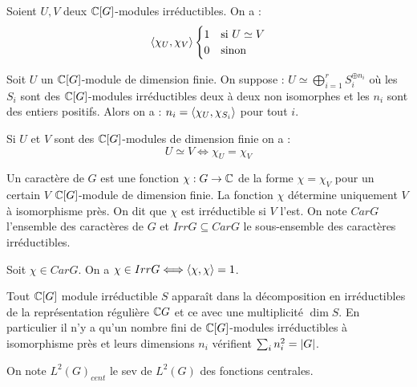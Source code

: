 \documentclass{cours}
\begin{document}
\begin{theorem}
    Soient $U, V$ deux $\mathbb{C}[G]$-modules irréductibles. On a :
    \[
        \left\langle \chi_{U}, \chi_{V} \right\rangle \begin{cases}
            1 & \text{si } U \simeq V \\
            0 & \text{sinon}
        \end{cases}
    \]
\end{theorem}
\begin{corollary}
    Soit $U$ un $\mathbb{C}[G]$-module de dimension finie. On suppose : $U \simeq \bigoplus_{i = 1}^{r} S_{i}^{\oplus n_{i}}$
    où les $S_{i}$ sont des $\mathbb{C}[G]$-modules irréductibles deux à deux non isomorphes et les $n_{i}$ sont des entiers positifs.
    Alors on a : $n_{i} = \left\langle \chi_{U}, \chi_{S_{i}} \right\rangle$ pour tout $i$.
\end{corollary}
\begin{corollary}
    Si $U$ et $V$ sont des $\mathbb{C}[G]$-modules de dimension finie on a :
    \[
        U \simeq V \Longleftrightarrow \chi_{U} = \chi_{V}
    \]
\end{corollary}

\begin{definition}
    Un caractère de $G$ est une fonction $\chi : G \rightarrow \mathbb{C}$ de la forme $\chi = \chi_V$ pour un certain $V$ $\mathbb{C}[G]$-module de dimension finie. La fonction $\chi$ détermine uniquement $V$ à isomorphisme près. On dit que $\chi$ est irréductible si $V$ l'est. On note $Car G$ l'ensemble des caractères de $G$ et $Irr G \subseteq Car G$ le sous-ensemble des caractères irréductibles.
\end{definition}

\begin{corollary}
    Soit $\chi \in Car G$. On a $\chi \in Irr G \Longleftrightarrow \left\langle \chi, \chi \right\rangle = 1$.
\end{corollary}

\begin{corollary}
    Tout $\mathbb{C}[G]$ module irréductible $S$ apparaît dans la décomposition en irréductibles de la représentation régulière $\mathbb{C} G$ et ce avec une multiplicité $\dim S$. En particulier il n'y a qu'un nombre fini de $\mathbb{C}[G]$-modules irréductibles à isomorphisme près et leurs dimensions $n_{i}$ vérifient $\sum_{i}n_{i}^{2} = \left|G\right|$.
\end{corollary}

\begin{definition}
    On note $L^{2}(G)_{cent}$ le sev de $L^{2}(G)$ des fonctions centrales.
\end{definition}
\end{document}
